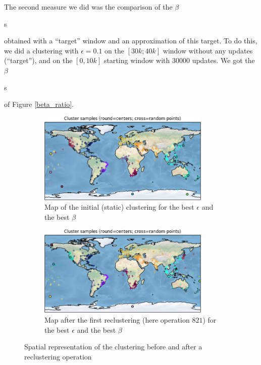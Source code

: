 \documentclass[a4paper,10pt]{article}
\begin{document}
		The second measure we did was the comparison of the $\beta$\begin{tiny}s\end{tiny} obtained with a ``target'' window and an approximation of this target. To do this, we did a clustering with $\epsilon = 0.1$ on the $[30k; 40k]$ window without any updates (``target''), and on the $[0, 10k]$ starting window with $30000$ updates. We got the $\beta$\begin{tiny}s\end{tiny} of Figure \ref{beta_ratio}.

\begin{appendices}
	\begin{figure}[h]
	\centering
	\begin{subfigure}[t]{0.4\textwidth}
		\centering
		\includegraphics[width=0.9\textwidth]{pictures/map_15_75000_15000_0.png}
		\caption{Map of the initial (static) clustering for the best $\epsilon$ and the best $\beta$}
	\end{subfigure} %
	\begin{subfigure}[t]{0.4\textwidth}
		\centering
		\includegraphics[width=0.9\textwidth]{pictures/map_15_75000_15000_821.png}
		\caption{Map after the first reclustering (here operation $821$) for the best $\epsilon$ and the best $\beta$}
\end{subfigure}
\caption{Spatial representation of the clustering before and after a reclustering operation}
\label{maps}
\end{figure}


\end{appendices}
\end{document}
